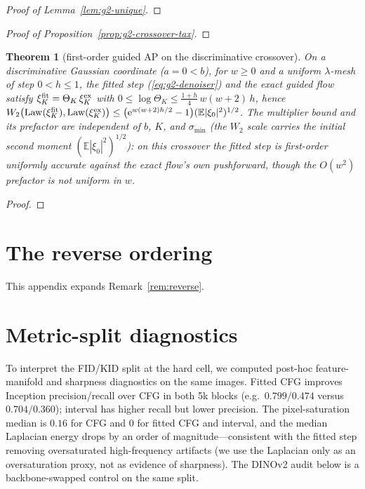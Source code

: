 \documentclass{article} %
\def\eqref#1{equation~\ref{#1}}
\newcommand{\E}{\mathbb{E}}
\theoremstyle{plain}
\newtheorem{theorem}{Theorem}
\theoremstyle{definition}
\theoremstyle{remark}
\providecommand{\eexp}{\mathrm{e}}
\providecommand{\smin}{\sigma_{\min}}
\def\eqref#1{(\ref{#1})}
\begin{document}
\begin{proof}[Proof of Lemma~\ref{lem:g2-unique}]
\ProofGTwoUnique
\end{proof}

\begin{proof}[Proof of Proposition~\ref{prop:g2-crossover-tax}]
\ProofGTwoTax
\end{proof}

\begin{theorem}[first-order guided AP on the discriminative crossover]\label{thm:cross-ap}
On a discriminative Gaussian coordinate ($a=0<b$), for $w\ge0$ and a uniform
$\lambda$-mesh of step $0<h\le1$, the fitted step \eqref{eq:g2-denoiser} and
the exact guided flow satisfy $\xi_K^{\rm fit}=\Theta_K\,\xi_K^{\rm ex}$ with
$0\le\log\Theta_K\le\tfrac{1+h}{4}\,w(w+2)\,h$, hence
$W_2\bigl(\mathrm{Law}(\xi_K^{\rm fit}),\mathrm{Law}(\xi_K^{\rm ex})\bigr)
\le\bigl(\eexp^{w(w+2)h/2}-1\bigr)(\E|\xi_0|^2)^{1/2}$.  The multiplier bound and
its prefactor are independent of $b$, $K$, and $\smin$ (the $W_2$ scale carries
the initial second moment $(\E|\xi_0|^2)^{1/2}$): on this crossover the fitted
step is first-order uniformly accurate against the exact flow's own pushforward,
though the $O(w^2)$ prefactor is not uniform in $w$.
\end{theorem}
\begin{proof}
\ProofGCrossAP
\end{proof}

\section{The reverse ordering}
\label{app:reverse}

This appendix expands Remark~\ref{rem:reverse}.

\ReverseFull

\section{Metric-split diagnostics}
\label{app:split}

To interpret the FID/KID split at the hard cell, we computed post-hoc
feature-manifold and sharpness diagnostics on the same images.  Fitted CFG
improves Inception precision/recall over CFG in both 5k blocks (e.g.\
$0.799/0.474$ versus $0.704/0.360$); interval has higher recall but lower
precision.  The pixel-saturation median is $0.16$ for CFG and $0$ for fitted
CFG and interval, and the median Laplacian energy drops by an order of
magnitude---consistent with the fitted step removing oversaturated
high-frequency artifacts (we use the Laplacian only as an oversaturation proxy,
not as evidence of sharpness).  The DINOv2 audit below is a backbone-swapped
control on the same split.
\end{document}
